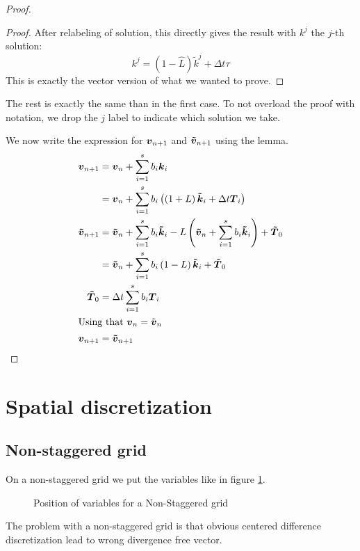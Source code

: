 \begin{proof}
\begin{proof}
After relabeling of solution, this directly gives the result with $k^{j}$ the $j$-th solution:
\begin{equation}
k^{j}=(1-\hat{L})\tilde{k}^{j}+\Delta t \tau
\end{equation}
This is exactly the vector version of what we wanted to prove.
\end{proof}

The rest is exactly the same than in the first case.
To not overload the proof with notation, we drop the $j$ label to indicate which solution we take.

We now write the expression for ${\boldsymbol {v}}_{n+1}$ and ${\boldsymbol {\tilde{v}}}_{n+1}$ using the lemma.
\begin{align*}
{\boldsymbol {v}}_{n+1}&={\boldsymbol {v}}_{n}+\sum_{i=1}^{s}b_{i}{\boldsymbol {k}}_{i}\\
&={\boldsymbol {v}}_{n}+\sum_{i=1}^{s}b_{i}\left(\left(1+L\right){\boldsymbol {\tilde{k}}}_i+\Delta t {\boldsymbol {T}}_{i}\right)\\
{\boldsymbol {\tilde{v}}}_{n+1}&={\boldsymbol {\tilde{v}}}_{n}+\sum_{i=1}^{s}b_{i}{\boldsymbol {\tilde{k}}}_{i}-L\left({\boldsymbol {\tilde{v}}}_{n}+\sum_{i=1}^{s}b_{i}{\boldsymbol {\tilde{k}}}_{i}\right)+{\boldsymbol {\tilde{T}}}_0\\
&={\boldsymbol {\tilde{v}}}_{n}+\sum_{i=1}^{s}b_{i}\left(1-L\right){\boldsymbol {\tilde{k}}}_{i}+{\boldsymbol {\tilde{T}}}_0\\
{\boldsymbol {\tilde{T}}}_0&=\Delta t\sum_{i=1}^{s}b_{i}{\boldsymbol {T}}_{i}\\
\intertext{Using that ${\boldsymbol {v}}_{n}=\tilde{{\boldsymbol {v}}}_{n}$}
{\boldsymbol {v}}_{n+1}&={\boldsymbol {\tilde{v}}}_{n+1}
\end{align*}

\end{proof}

\section{Spatial discretization}

\subsection{Non-staggered grid}

On a non-staggered grid we put the variables like in figure \ref{fixed:unstaggered}.
\begin{figure}
\caption{Position of variables for a Non-Staggered grid}
\label{fixed:unstaggered}
\end{figure}
The problem with a non-staggered  grid is that obvious centered difference discretization lead to wrong divergence free vector.

